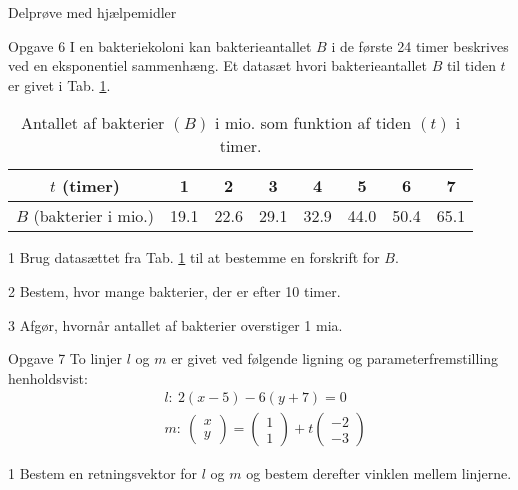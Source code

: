 \newpage
\begin{center}
\LARGE
Delprøve med hjælpemidler 
\end{center}

\begin{opgavetekst}{Opgave 6}
	I en bakteriekoloni kan bakterieantallet $B$ i de første 24 timer beskrives ved en eksponentiel sammenhæng. Et datasæt hvori bakterieantallet $B$ til tiden $t$ er givet i 
	Tab. \ref{tab:bakterie}.
	\begin{table}[H]
		\centering
		\begin{tabular}{c|c|c|c|c|c|c|c}
		$t$ (timer) &1 & 2 & 3 & 4 & 5 & 6 & 7 \\
		\hline
		$B$ (bakterier i mio.) & 19.1 & 22.6 & 29.1 & 32.9 & 44.0 & 50.4 & 65.1
		\end{tabular}
		\caption{Antallet af bakterier $(B)$ i mio. som funktion af tiden $(t)$ i timer. }
		\label{tab:bakterie}
	\end{table}\phantom{h}
\end{opgavetekst}
\begin{delopgave}{}{1}
	Brug datasættet fra Tab. \ref{tab:bakterie} til at bestemme en forskrift for $B$.
\end{delopgave}
\begin{delopgave}{}{2}
	Bestem, hvor mange bakterier, der er efter 10 timer. 
\end{delopgave}
\begin{delopgave}{}{3}
	Afgør, hvornår antallet af bakterier overstiger 1 mia.
\end{delopgave}
\begin{opgavetekst}{Opgave 7}
	To linjer $l$ og $m$ er givet ved følgende ligning og parameterfremstilling henholdsvist:
	\begin{align*}
		&l: \ 2(x-5)-6(y+7) = 0 \\
		&m: \ 
		\begin{pmatrix}
			x \\ y
		\end{pmatrix}=
		\begin{pmatrix}
			1 \\ 1
		\end{pmatrix} + t
		\begin{pmatrix}
			-2 \\ -3
		\end{pmatrix}
	\end{align*}
\end{opgavetekst}
\begin{delopgave}{}{1}
	Bestem en retningsvektor for $l$ og $m$ og bestem derefter vinklen mellem linjerne. 
\end{delopgave}
